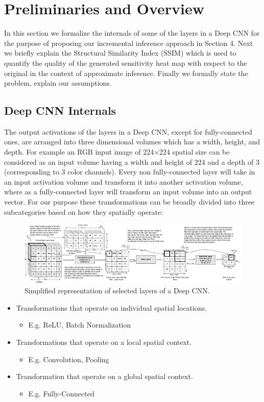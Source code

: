 \section{Preliminaries and Overview}\label{sec:preliminaries}
In this section we formalize the internals of some of the layers in a Deep CNN for the purpose of proposing our incremental inference approach in Section 4. Next we briefly explain the Structural Similarity Index (SSIM) which is used to quantify the quality of the generated sensitivity heat map with respect to the original in the context of approximate inference. Finally we formally state the problem, explain our assumptions.

\subsection{Deep CNN Internals}
The output activations of the layers in a Deep CNN, except for fully-connected ones, are arranged into three dimensional volumes which has a width, height, and depth.
For example an RGB input image of 224$\times$224 spatial size can be considered as an input volume having a width and height of 224 and a depth of 3 (corresponding to 3 color channels). Every non fully-connected layer will take in an input activation volume and transform it into another activation volume, where as a fully-connected layer will transform an input volume into an output vector. For our purpose these transformations can be broadly divided into three subcategories based on how they spatially operate:

\begin{figure}[t]
\includegraphics[width=\textwidth]{images/cnn_simplified}
\caption{Simplified representation of selected layers of a Deep CNN.}
\end{figure}

\begin{itemize}
	\item Transformations that operate on individual spatial locations.
	\begin{itemize}
	 \item E.g. ReLU, Batch Normalization
	\end{itemize}
	\item Transformations that operate on a local spatial context.
	\begin{itemize}
	 \item E.g. Convolution, Pooling
	\end{itemize}
	\item Transformation that operate on a global spatial context.
	\begin{itemize}
	 \item E.g. Fully-Connected
	\end{itemize}
\end{itemize}

